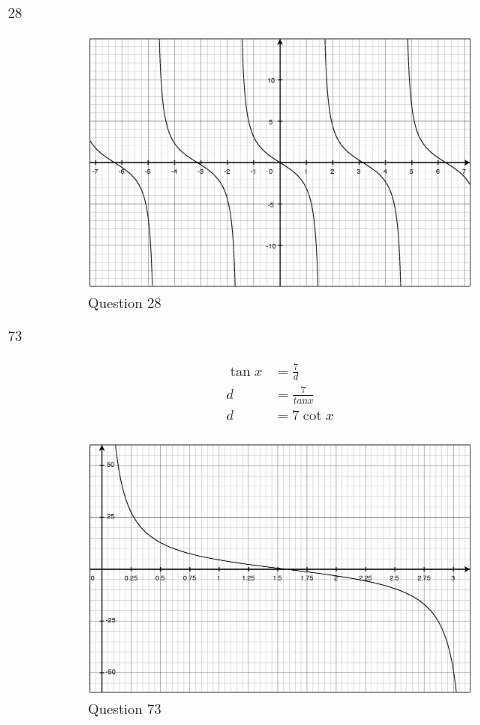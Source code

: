 \documentclass[fleqn,addpoints]{exam}
\begin{document}
\begin{description}
\item[28]
\begin{figure}[H]
  \centering
  \includegraphics[scale=.3]{question_4.6_28.eps}
  \caption*{Question 28}
\end{figure}

\item[73]

\begin{align*}
  \tan x &= \frac{7}{d} \\
  d &= \frac{7}{tan x} \\
  d &= 7 \cot x \\
\end{align*}

\begin{figure}[H]
  \centering
  \includegraphics[scale=.3]{question_4.6_73.eps}
  \caption*{Question 73}
\end{figure}


\end{description}
\end{document}
